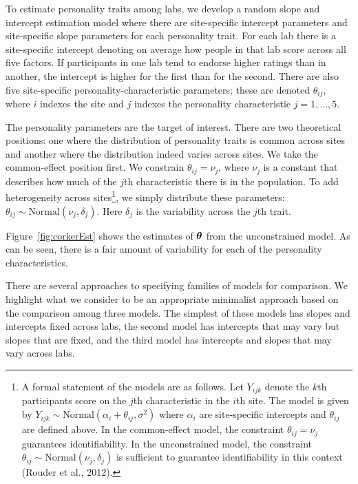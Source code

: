 \documentclass[english,man]{apa6}
\theoremstyle{definition}
\theoremstyle{definition}
\theoremstyle{definition}
\theoremstyle{remark}
\begin{document}
To estimate personality traits among labs, we develop a random slope and
intercept estimation model where there are site-specific intercept
parameters and site-specific slope parameters for each personality
trait. For each lab there is a site-specific intercept denoting on
average how people in that lab score across all five factors. If
participants in one lab tend to endorse higher ratings than in another,
the intercept is higher for the first than for the second. There are
also five site-specific personality-characteristic parameters; these are
denoted \(\theta_{ij}\), where \(i\) indexes the site and \(j\) indexes
the personality characteristic \(j=1,\ldots,5\).

The personality parameters are the target of interest. There are two
theoretical positions: one where the distribution of personality traits
is common across sites and another where the distribution indeed varies
across sites. We take the common-effect position first. We constrain
\(\theta_{ij}=\nu_j\), where \(\nu_j\) is a constant that describes how
much of the \(j\)th characteristic there is in the population. To add
heterogeneity across sites\footnote{A formal statement of the models are
  as follows. Let \(Y_{ijk}\) denote the \(k\)th participants score on
  the \(j\)th characteristic in the \(i\)th site. The model is given by
  \(Y_{ijk} \sim \mbox{Normal}(\alpha_i+\theta_{ij},\sigma^2)\) where
  \(\alpha_i\) are site-specific intercepts and \(\theta_{ij}\) are
  defined above. In the common-effect model, the constraint
  \(\theta_{ij}=\nu_j\) guarantees identifiability. In the unconstrained
  model, the constraint
  \(\theta_{ij} \sim \mbox{Normal}(\nu_j,\delta_j)\) is sufficient to
  guarantee identifiability in this context (Rouder et al., 2012).}, we
simply distribute these parameters:
\(\theta_{ij} \sim \mbox{Normal}(\nu_j,\delta_j)\). Here \(\delta_j\) is
the variability across the \(j\)th trait.

Figure~\ref{fig:corkerEst} shows the estimates of \(\bm \theta\) from the
unconstrained model. As can be seen, there is a fair amount of
variability for each of the personality characteristics.

There are several approaches to specifying families of models for
comparison. We highlight what we consider to be an appropriate
minimalist approach based on the comparison among three models. The
simplest of these models has slopes and intercepts fixed across labs,
the second model has intercepts that may vary but slopes that are fixed,
and the third model has intercepts and slopes that may vary across labs.
\end{document}
